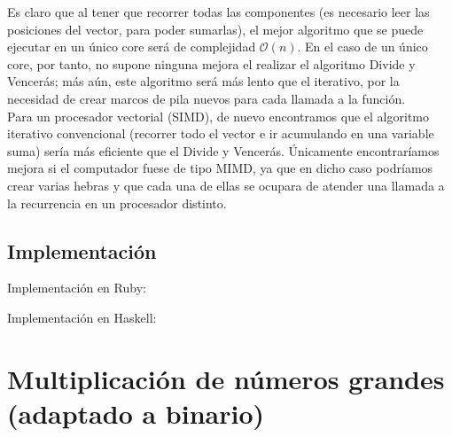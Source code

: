 \documentclass[a4paper, 11pt]{article} %
\begin{document}
Es claro que al tener que recorrer todas las componentes (es necesario leer las posiciones
del vector, para poder sumarlas), el mejor algoritmo que se puede ejecutar en un único core 
será de complejidad $\mathcal{O}(n)$. En el caso de un único core, por tanto, no supone ninguna
mejora el realizar el algoritmo Divide y Vencerás; más aún, este algoritmo será más lento que el
iterativo, por la necesidad de crear marcos de pila nuevos para cada llamada a la función.\\
Para un procesador vectorial (SIMD), de nuevo encontramos que el algoritmo iterativo convencional
(recorrer todo el vector e ir acumulando en una variable suma) sería más eficiente que el Divide y Vencerás.
Únicamente encontraríamos mejora si el computador fuese de tipo MIMD, ya que en dicho caso podríamos crear
varias hebras y que cada una de ellas se ocupara de atender una llamada a la recurrencia en un procesador distinto.

\subsection{Implementación}
Implementación en Ruby:

\small
\texttt{}
\normalsize

Implementación en Haskell:

\small
\texttt{}
\normalsize

\section {Multiplicación de números grandes (adaptado a binario)}
\end{document}
